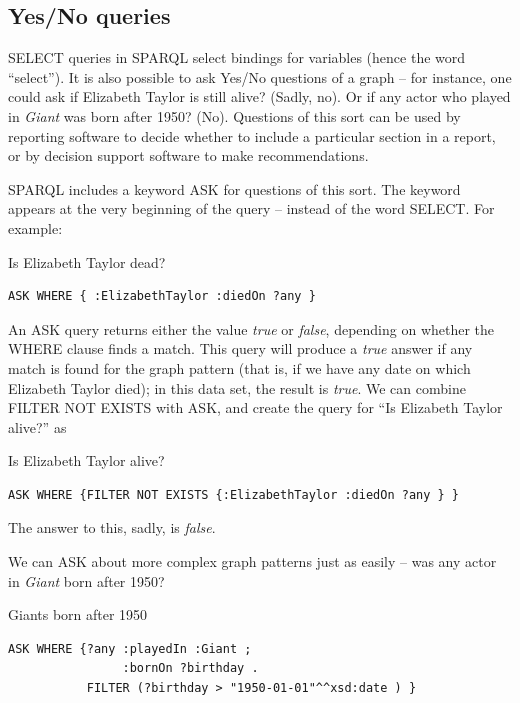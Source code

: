 \subsection{Yes/No queries}

SELECT queries in SPARQL select bindings for variables (hence the word
``select''). It is also possible to ask Yes/No questions of a graph --
for instance, one could ask if Elizabeth Taylor is still alive? (Sadly,
no). Or if any actor who played in \emph{Giant} was born after 1950?
(No). Questions of this sort can be used by reporting software to decide
whether to include a particular section in a report, or by decision
support software to make recommendations.

SPARQL includes a keyword ASK for questions of this sort. The keyword
appears at the very beginning of the query -- instead of the word
SELECT. For example:

\begin{query}Is Elizabeth Taylor dead?\end{query}
\begin{lstlisting}
ASK WHERE { :ElizabethTaylor :diedOn ?any }
\end{lstlisting}

An ASK query returns either the value \emph{true} or \emph{false}, depending on 
whether the WHERE clause finds a match.  This query will produce a \emph{true} answer if any match is found for the
graph pattern (that is, if we have any date on which Elizabeth Taylor
died); in this data set, the result is \emph{true}. We can combine FILTER NOT
EXISTS with ASK, and create the query for ``Is Elizabeth Taylor alive?''
as

\begin{query}Is Elizabeth Taylor alive?\end{query}
\begin{lstlisting}
ASK WHERE {FILTER NOT EXISTS {:ElizabethTaylor :diedOn ?any } }
\end{lstlisting}

The answer to this, sadly, is \emph{false}.

We can ASK about more complex graph patterns just as easily -- was any
actor in \emph{Giant} born after  1950?

\begin{query}Giants born after 1950\end{query}
\begin{lstlisting}
ASK WHERE {?any :playedIn :Giant ;
                :bornOn ?birthday .
           FILTER (?birthday > "1950-01-01"^^xsd:date ) }
\end{lstlisting}

